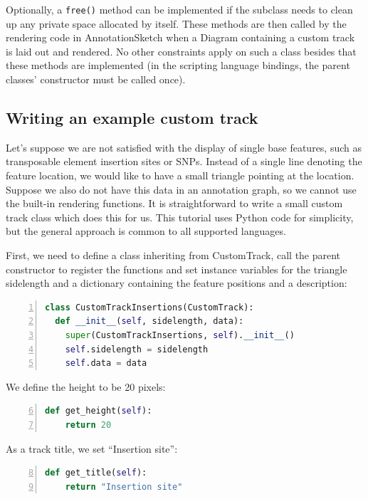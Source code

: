 \documentclass[a4paper]{scrreprt}
\begin{document}
Optionally, a \texttt{free()} method can be implemented if the subclass needs to clean up any private space allocated by itself. These methods are then called by the rendering code in AnnotationSketch when a Diagram containing a custom track is laid out and rendered. No other constraints apply on such a class besides that these methods are implemented (in the scripting language bindings, the parent classes' constructor must be called once).

\subsection{Writing an example custom track}

Let's suppose we are not satisfied with the display of single base features, such as transposable element insertion sites or SNPs. Instead of a single line denoting the feature location, we would like to have a small triangle pointing at the location. Suppose we also do not have this data in an annotation graph, so we cannot use the built-in rendering functions. It is straightforward to write a small custom track class which does this for us.
This tutorial uses Python code for simplicity, but the general approach is common to all supported languages.

First, we need to define a class inheriting from CustomTrack, call the parent constructor to register the functions and set instance variables for the triangle sidelength and a dictionary containing the feature positions and a description:

\begin{lstlisting}[language=Python, showstringspaces=false,numbers=left,frame=single]
class CustomTrackInsertions(CustomTrack):
  def __init__(self, sidelength, data):
    super(CustomTrackInsertions, self).__init__()
    self.sidelength = sidelength
    self.data = data
\end{lstlisting}

We define the height to be 20 pixels:

\begin{lstlisting}[language=Python, firstnumber=6, showstringspaces=false,numbers=left,frame=single]
  def get_height(self):
    return 20
\end{lstlisting}

As a track title, we set ``Insertion site'':

\begin{lstlisting}[language=Python, firstnumber=8,  showstringspaces=false,numbers=left,frame=single]
  def get_title(self):
    return "Insertion site"
\end{lstlisting}
\end{document}
